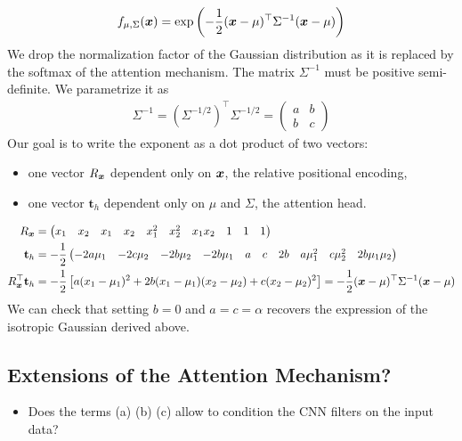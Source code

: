 \documentclass{article} %
\begin{document}
\begin{align}
  f_{\mu, \Sigma}({\bm{x}}) = \exp \left(
    - \frac 1 2
    ({\bm{x}} - \mu)^\top \Sigma^{-1} ({\bm{x}} - \mu)
  \right)
\end{align}
We drop the normalization factor of the Gaussian distribution as it is replaced by the softmax of the attention mechanism.
The matrix $\Sigma^{-1}$ must be positive semi-definite.
We parametrize it as 
\begin{align}
  \Sigma^{-1} = (\Sigma^{-1/2})^\top\Sigma^{-1/2} = \begin{pmatrix}a & b \\ b & c\end{pmatrix}  
\end{align}
Our goal is to write the exponent as a dot product of two vectors:
\begin{itemize}
  \item one vector $R_{\bm{x}}$ dependent only on ${\bm{x}}$, the relative positional encoding,
  \item one vector $\mathbf{t}_h$ dependent only on $\mu$ and $\Sigma$, the attention head.
\end{itemize}
\begin{align}
  R_{\bm{x}} &= 
  \begin{pmatrix}
    x_1      & x_2       & x_1      & x_2      & x_1^2   & x_2^2 & x_1 x_2 & 1        & 1         & 1
  \end{pmatrix}\\
  \mathbf{t}_h &= -\frac{1}{2}
  \begin{pmatrix}
    -2a\mu_1 & -2c \mu_2 & -2b\mu_2 & -2b\mu_1 & a       & c     & 2b      & a\mu_1^2 & c\mu_2^2 & 2b\mu_1 \mu_2
  \end{pmatrix}\\
  R_{\bm{x}}^\top \mathbf{t}_h &=
  -\frac{1}{2} 
  \left[
  a(x_1 - \mu_1)^2 + 2b(x_1-\mu_1)(x_2 -\mu_2) + c(x_2-\mu_2)^2 
  \right]
  = - \frac 1 2 ({\bm{x}} - \mu)^\top \Sigma^{-1} ({\bm{x}} - \mu)
\end{align}
We can check that setting $b = 0$ and $a=c=\alpha$ recovers the expression of the isotropic Gaussian derived above.


\subsection{Extensions of the Attention Mechanism?} 
\begin{itemize}

  \item Does the terms (a) (b) (c) allow to condition the CNN filters on the input data?
\end{itemize}
\end{document}
